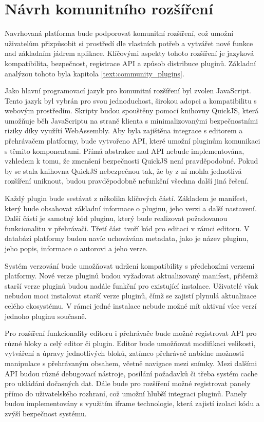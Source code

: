 \section{Návrh komunitního rozšíření}\label{text:navrh/plugins}

Navrhovaná platforma bude podporovat komunitní rozšíření, což umožní uživatelům přizpůsobit si prostředí dle vlastních potřeb a vytvářet nové funkce nad základním jádrem aplikace.
Klíčovými aspekty tohoto rozšíření je jazyková kompatibilita, bezpečnost, registrace API a způsob distribuce pluginů.
Základní analýzou tohoto byla kapitola \ref{text:community_plugins}.

Jako hlavní programovací jazyk pro komunitní rozšíření byl zvolen JavaScript.
Tento jazyk byl vybrán pro svou jednoduchost, širokou adopci a kompatibilitu s webovým prostředím.
Skripty budou spouštěny pomocí knihovny QuickJS, která umožňuje běh JavaScriptu na straně klienta s minimalizovanými bezpečnostními riziky díky využítí WebAssembly.
Aby byla zajištěna integrace s editorem a přehrávačem platformy, bude vytvořeno API, které umožní pluginům komunikaci s těmito komponentami. 
Přímá abstrakce nad API nebude implementována, vzhledem k tomu, že zmenšení bezpečnosti QuickJS není pravděpodobné.
Pokud by se stala knihovna QuickJS nebezpečnou tak, že by z ní mohla jednotlivá rozšíření uniknout, budou pravděpodobně nefunkční všechna další jiná řešení.

Každý plugin bude sestávat z několika klíčových částí. 
Základem je manifest, který bude obsahovat základní informace o pluginu, jeho verzi a další nastavení. 
Další částí je samotný kód pluginu, který bude realizovat požadovanou funkcionalitu v přehrávači. 
Třetí část tvoří kód pro editaci v rámci editoru. 
V databázi platformy budou navíc uchovávána metadata, jako je název pluginu, jeho popis, informace o autorovi a jeho verze.

Systém verzování bude umožňovat udržení kompatibility s předchozími verzemi platformy. 
Nové verze pluginů budou vyžadovat aktualizovaný manifest, přičemž starší verze pluginů budou nadále funkční pro existující instalace. 
Uživatelé však nebudou moci instalovat starší verze pluginů, čímž se zajistí plynulá aktualizace celého ekosystému.
V rámci jedné instalace nebude možné mít aktivní více verzí jednoho pluginu současně.

Pro rozšíření funkcionality editoru i přehrávače bude možné registrovat API pro různé bloky a celý editor či plugin.
Editor bude umožňovat modifikaci velikosti, vytváření a úpravy jednotlivých bloků, zatímco přehrávač nabídne možnosti manipulace s přehrávaným obsahem, včetně navigace mezi snímky.
Mezi dalšími API budou různé debugovací nástroje, posílání požadavků či třeba systém cache pro ukládání dočasných dat.
Dále bude pro rozšíření možné registrovat panely přímo do uživatelského rozhraní, což umožní hlubší integraci pluginů.
Panely budou implementovány s využitím iframe technologie, která zajistí izolaci kódu a zvýší bezpečnost systému.

